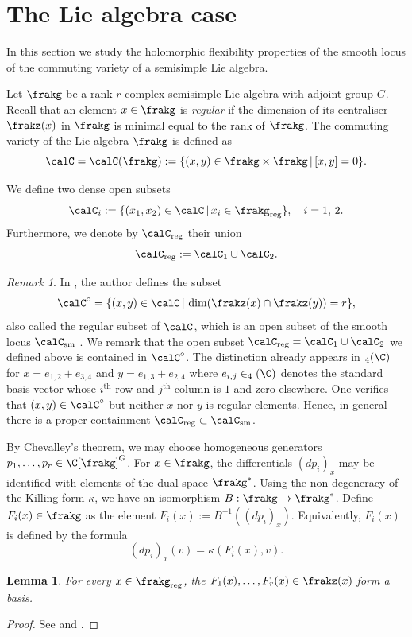 \documentclass[12pt, a4paper, oneside]{amsart}
\theoremstyle{plain} %
\newtheorem{lemma}[theorem]{Lemma}
\theoremstyle{definition} %
\theoremstyle{remark} %
\newtheorem{remark}[theorem]{Remark}
\begin{document}
\section{The Lie algebra case}\label{c:Liealgebra}
In this section we study the holomorphic flexibility properties of the smooth locus of the commuting variety of a semisimple Lie algebra. 

Let $\frakg$ be a rank $r$ complex semisimple Lie algebra with adjoint group $G$. Recall that an element $x\in \frakg$ is \emph{regular} if the dimension of its centraliser $\frakz(x)$ in $\frakg$ is minimal equal to the rank of $\frakg$. The commuting variety of the Lie algebra $\frakg$ is defined as
\[\calC=\calC(\frakg) := \{(x,y)\in \frakg\times \frakg \,|\, [x,y]=0\}.\]

We define two dense open subsets
\[\calC_{i}:=\{(x_1,x_2)\in \calC\,|\,x_i\in \frakg_{\rm reg}\},\quad i=1,\,2.\]
Furthermore, we denote by $\calC_{\rm reg}$ their union
\[\calC_{\rm reg}:=\calC_1\cup \calC_2.\]

\begin{remark}
In \cite[\S 2]{Popov}, the author defines the subset
 \[\calC^\circ = \{(x,y)\in \calC\,|\, \dim (\frakz(x)\cap \frakz(y)) = r\},\]
 also called the regular subset of $\calC$, which is an open subset of the smooth locus $\calC_{\rm sm}$ \cite[Theorem 1.3 (ii)]{Popov}. We remark that the open subset $\calC_{\rm reg} = \calC_1\cup \calC_2$ we defined above is contained in $\calC^\circ$. The distinction already appears in $\sl_4(\C)$ for $x=e_{1,2}+e_{3,4}$ and $y=e_{1,3}+e_{2,4}$ where $e_{i,j}\in \sl_4(\C)$ denotes the standard basis vector whose $i^{\text{th}}$ row and $j^{\text{th}}$ column is $1$ and zero elsewhere. One verifies that $(x,y)\in \calC^\circ$ but neither $x$ nor $y$ is regular elements. Hence, in general there is a proper containment $\calC_{\rm reg}\subset \calC_{\rm sm}$.
\end{remark}
By Chevalley's theorem, we may choose homogeneous generators $p_1, \dots, p_r\in \C[\frakg]^G$. For $x\in \frakg$, the differentials $(dp_i)_x$ may be identified with elements of the dual space $\frakg^*$. Using the non-degeneracy of the Killing form $\kappa$, we have an isomorphism $B:\frakg\to \frakg^*$. Define $F_i(x) \in \frakg$ as the element $F_i(x) := B^{-1}((dp_i)_x)$. Equivalently, $F_i(x)$ is defined by the formula
\[(dp_i)_{x}(v) = \kappa(F_i(x),v).\]

\begin{lemma}\label{lem:Kostantbasis}
For every $x\in \frakg_{\rm reg}$, the $F_1(x),\dots, F_r(x)\in \frakz(x)$ form a basis.
\end{lemma}
\begin{proof}
See \cite[Proposition 1.3]{Kos79} and \cite[Theorem 0.1]{Kos63}.
\end{proof}
\end{document}
